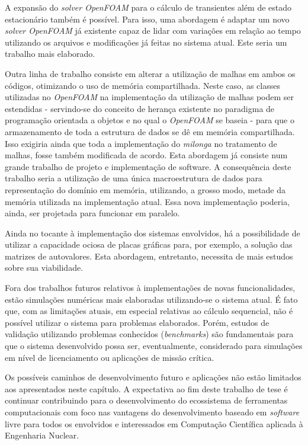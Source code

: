 A expansão do \textit{solver OpenFOAM} para o cálculo de transientes além de estado estacionário também é possível.
Para isso, uma abordagem é adaptar um novo \textit{solver OpenFOAM} já existente capaz de lidar com variações em relação
ao tempo utilizando os arquivos e modificações já feitas no sistema atual. Este seria um trabalho mais elaborado.

Outra linha de trabalho consiste em alterar a utilização de malhas em ambos os códigos, otimizando o uso de memória
compartilhada. Neste caso, as classes utilizadas no \textit{OpenFOAM} na implementação da utilização de malhas podem
ser estendidas - servindo-se do conceito de herança existente no paradigma de programação orientada a objetos e
no qual o \textit{OpenFOAM} se baseia - para que o armazenamento de toda a estrutura de dados se dê em memória compartilhada.
Isso exigiria ainda que toda a implementação do \textit{milonga} no tratamento de malhas, fosse também modificada de acordo.
Esta abordagem já consiste num grande trabalho de projeto e implementação de software. A consequência deste trabalho seria
a utilização de uma única macroestrutura de dados para representação do domínio em memória, utilizando, a grosso modo,
metade da memória utilizada na implementação atual. Essa nova implementação poderia, ainda, ser projetada para
funcionar em paralelo.

Ainda no tocante à implementação dos sistemas envolvidos, há a possibilidade de utilizar a capacidade ociosa de placas
gráficas para, por exemplo, a solução das matrizes de autovalores. Esta abordagem, entretanto, necessita de mais estudos
sobre sua viabilidade.

Fora dos trabalhos futuros relativos à implementações de novas funcionalidades, estão simulações numéricas mais elaboradas
utilizando-se o sistema atual. É fato que, com as limitações atuais, em especial relativas ao cálculo sequencial, não é
possível utilizar o sistema para problemas elaborados. Porém, estudos de validação utilizando problemas conhecidos
(\textit{benchmarks}) são fundamentais para que o sistema desenvolvido possa ser, eventualmente, considerado para
simulações em nível de licenciamento ou aplicações de missão crítica.

Os possíveis caminhos de desenvolvimento futuro e aplicações não estão limitados aos apresentados neste capítulo.
A expectativa ao fim deste trabalho de tese é continuar contribuindo para o desenvolvimento do ecossistema de
ferramentas computacionais com foco nas vantagens do desenvolvimento baseado em \textit{software} livre para todos
os envolvidos e interessados em Computação Científica aplicada à Engenharia Nuclear.



